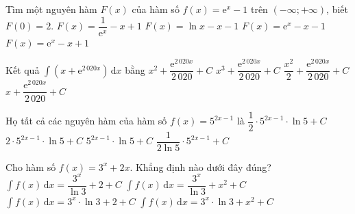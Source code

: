 \begin{ex}%
	Tìm một nguyên hàm $F(x)$ của hàm số $f(x)=\mathrm{e}^x-1$ trên $(-\infty; +\infty)$,  biết $F(0)=2$.
	 \choice
		{$F(x)=\dfrac{1}{\mathrm{e}^x}-x+1$} 
		{$F(x)=\ln x-x-1$} 
		 {$F(x)=\mathrm{e}^x-x-1$}
		 {\True $F(x)=\mathrm{e}^x-x+1$}
\end{ex}

\begin{ex}%
	Kết quả  $\displaystyle\int (x+\mathrm{e}^{2\,020x})\mathrm{\,d}x$ bằng
	 \choice
		{$x^2+\dfrac{\mathrm{e}^{2\,020x}}{2\,020}+C$} 
		{$x^3+\dfrac{\mathrm{e}^{2\,020x}}{2\,020}+C$} 
		 {\True $\dfrac{x^2}{2}+\dfrac{\mathrm{e}^{2\,020x}}{2\,020}+C$}
		 {$x+\dfrac{\mathrm{e}^{2\,020x}}{2\,020}+C$}
\end{ex}

\begin{ex}%
	Họ tất cả các nguyên hàm của  hàm số $f(x)=5^{2x-1}$ là
	 \choice
		{$\dfrac{1}{2} \cdot  5^{2x-1} \cdot \ln 5+C$}
		{$2 \cdot 5^{2x-1}  \cdot \ln 5+C$}
		{$5^{2x-1} \cdot \ln 5+C$} 
		{\True $\dfrac{1}{2\ln 5} \cdot  5^{2x-1}+C$}
\end{ex}

\begin{ex}%
	Cho hàm số $f(x)=3^x+2x$. Khẳng định nào dưới đây đúng? 
	\choice 
		 {$\displaystyle\int f(x)\mathrm{\,d}x=\dfrac{3^x}{\ln 3}+2+C$}
		{\True $\displaystyle\int f(x)\mathrm{\,d}x=\dfrac{3^x}{\ln 3}+x^2+C$} 
		{$\displaystyle\int f(x)\mathrm{\,d}x=3^x  \cdot \ln 3+2+C$}
		 {$\displaystyle\int f(x)\mathrm{\,d}x=3^x \cdot \ln 3+x^2+C$}
\end{ex}

